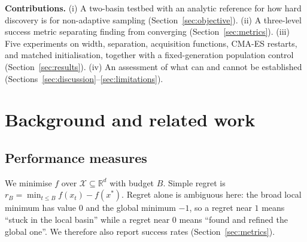\documentclass[11pt,a4paper]{article}
\newcommand{\R}{\mathbb{R}}
\begin{document}
\textbf{Contributions.} (i) A two-basin testbed with an analytic reference for how hard discovery is for non-adaptive sampling (Section~\ref{sec:objective}). (ii) A three-level success metric separating finding from converging (Section~\ref{sec:metrics}). (iii) Five experiments on width, separation, acquisition functions, CMA-ES restarts, and matched initialisation, together with a fixed-generation population control (Section~\ref{sec:results}). (iv) An assessment of what can and cannot be established (Sections~\ref{sec:discussion}--\ref{sec:limitations}).

\section{Background and related work}

\subsection{Performance measures}
We minimise $f$ over $\mathcal{X}\subseteq\R^d$ with budget $B$. Simple regret is $r_B=\min_{t\le B}f(x_t)-f(x^*)$. Regret alone is ambiguous here: the broad local minimum has value $0$ and the global minimum $-1$, so a regret near $1$ means ``stuck in the local basin'' while a regret near $0$ means ``found and refined the global one''. We therefore also report success rates (Section~\ref{sec:metrics}).
\end{document}
